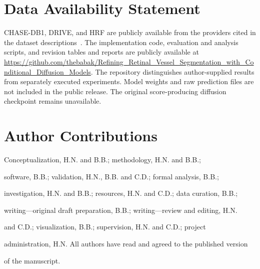 \documentclass[jimaging,article,submit,pdftex,moreauthors]{Definitions/mdpi}%
\providecommand{\dataavailability}[1]{\section*{Data Availability Statement}#1}
\providecommand{\authorcontributions}[1]{\section*{Author Contributions}#1}
\begin{document}






\dataavailability{CHASE-DB1, DRIVE, and HRF are publicly available from the providers cited in the dataset descriptions~\cite{CHASEDB1,Staal2004,Odstrcilik2013HRF}. The implementation code, evaluation and analysis scripts, and revision tables and reports are publicly available at \url{https://github.com/thebabak/Refining_Retinal_Vessel_Segmentation_with_Conditional_Diffusion_Models}. The repository distinguishes author-supplied results from separately executed experiments. Model weights and raw prediction files are not included in the public release. The original score-producing diffusion checkpoint remains unavailable.}





\authorcontributions{Conceptualization, H.N. and B.B.; methodology, H.N. and B.B.;

software, B.B.; validation, H.N., B.B. and C.D.; formal analysis, B.B.;

investigation, H.N. and B.B.; resources, H.N. and C.D.; data curation, B.B.;

writing---original draft preparation, B.B.; writing---review and editing, H.N.

and C.D.; visualization, B.B.; supervision, H.N. and C.D.; project

administration, H.N. All authors have read and agreed to the published version

of the manuscript.}




\end{document}
